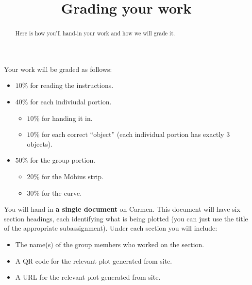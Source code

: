 \documentclass[noauthor,nooutcomes]{ximera}
\title{Grading your work}
\begin{document}
\begin{abstract}
  Here is how you'll hand-in your work and how we will grade it.
\end{abstract}
\maketitle

Your work will be graded as follows:

\begin{itemize}
\item $10\%$ for reading the instructions.
\item $40\%$ for each indiviudal portion.
  \begin{itemize}
  \item $10\%$ for handing it in.
  \item $10\%$ for each correct ``object'' (each individual portion has exactly $3$ objects).
  \end{itemize}
\item $50\%$ for the group portion.
  \begin{itemize}
  \item $20\%$ for the M\"obius strip. 
  \item $30\%$ for the curve.
  \end{itemize}
\end{itemize}

You will hand in \textbf{a single document} on Carmen. This document
will have six section headings, each identifying what is being plotted
(you can just use the title of the appropriate subassignment).  Under
each section you will include:
\begin{itemize}
\item The name(s) of the group members who worked on the section.
\item A QR code for the relevant plot generated from
   site.
\item A URL for the relevant plot generated from
   site.
\end{itemize}
\end{document}
